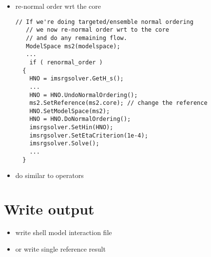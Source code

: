 \begin{itemize}
  \item re-normal order wrt the core 
  \begin{lstlisting}[frame=single]
   // If we're doing targeted/ensemble normal ordering 
   // we now re-normal order wrt to the core
   // and do any remaining flow.
   ModelSpace ms2(modelspace);
   ...
    if ( renormal_order )
  {
    HNO = imsrgsolver.GetH_s();
    ...
    HNO = HNO.UndoNormalOrdering(); 
    ms2.SetReference(ms2.core); // change the reference
    HNO.SetModelSpace(ms2);
    HNO = HNO.DoNormalOrdering();
    imsrgsolver.SetHin(HNO);
    imsrgsolver.SetEtaCriterion(1e-4);
    imsrgsolver.Solve();
    ... 
  }
  \end{lstlisting} 
  \item do similar to operators 
\end{itemize} 

\section{Write output}
\begin{itemize}
  \item write shell model interaction file 
  \item or write single reference result  
\end{itemize} 
